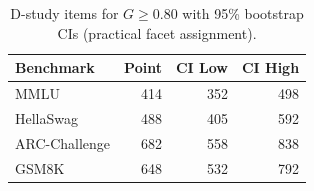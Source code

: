 \documentclass[11pt,letterpaper]{article}
\begin{document}
\begin{table}[h]
\centering
\caption{D-study items for $G \geq 0.80$ with 95\% bootstrap CIs (practical facet assignment).}
\label{tab:dstudy_ci}
\small
\begin{tabular}{@{}lrrr@{}}
\toprule
Benchmark & Point & CI Low & CI High \\
\midrule
MMLU & 414 & 352 & 498 \\
HellaSwag & 488 & 405 & 592 \\
ARC-Challenge & 682 & 558 & 838 \\
GSM8K & 648 & 532 & 792 \\
\bottomrule
\end{tabular}
\end{table}
\end{document}
